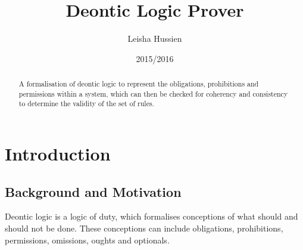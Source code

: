 \documentclass{l4proj}
\begin{document}
\title{Deontic Logic Prover}
\author{Leisha Hussien}
\date{2015/2016}
\maketitle

\begin{abstract}
A formalisation of deontic logic to represent the obligations, prohibitions and permissions within a system, which can then be checked for coherency and consistency to determine the validity of the set of rules.
\end{abstract}

\educationalconsent

\tableofcontents













\chapter{Introduction}

\section{Background and Motivation}
Deontic logic is a logic of duty, which formalises conceptions of what should and should not be done. These conceptions can include obligations, prohibitions, permissions, omissions, oughts and optionals. 
\end{document}
